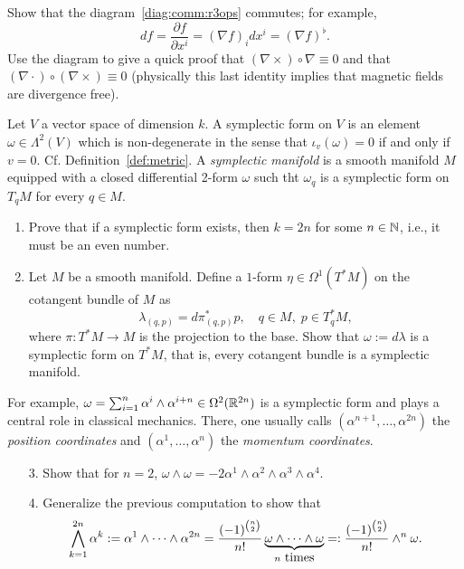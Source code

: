 \begin{exercise}
  Show that the diagram~\eqref{diag:comm:r3ops} commutes; for example,
  \begin{equation}
    df = \frac{\partial f}{\partial x^i} = (\nabla f)_i dx^i = (\nabla f)^\flat.
  \end{equation}
  Use the diagram to give a quick proof that $(\nabla\times)\circ \nabla \equiv 0$ and that $(\nabla\cdot) \circ (\nabla\times) \equiv 0$ (physically this last identity implies that magnetic fields are divergence free).
\end{exercise}

\begin{exercise}\label{exe:symplectic}
  Let $V$ a vector space of dimension $k$.
  A symplectic form on $V$ is an element $\omega\in\Lambda^2(V)$ which is non-degenerate in the sense that $\iota_v(\omega) = 0$ if and only if $v=0$.
  Cf. Definition~\ref{def:metric}.
  A \emph{symplectic manifold} is a smooth manifold $M$ equipped with a closed differential 2-form $\omega$ such tht $\omega_q$ is a symplectic form on $T_q M$ for every $q\in M$.
  \begin{enumerate}
    \item Prove that if a symplectic form exists, then $k=2n$ for some $n\in\mathbb{N}$, i.e., it must be an even number.
    \item Let $M$ be a smooth manifold. Define a $1$-form $\eta\in\Omega^1(T^*M)$ on the cotangent bundle of $M$ as
    \begin{equation}
      \lambda_{(q,p)} = d\pi_{(q,p)}^*p,
      \quad
      q\in M, \;
      p\in T_q^*M,
    \end{equation}
    where $\pi:T^*M\to M$ is the projection to the base.
    Show that $\omega := d\lambda$ is a symplectic form on $T^* M$, that is, every cotangent bundle is a symplectic manifold.
  \end{enumerate}

  For example, $\omega = \sum_{i=1}^n \alpha^i\wedge \alpha^{i+n}\in\Omega^2(\mathbb{R}^{2n})$ is a symplectic form and plays a central role in classical mechanics. There, one usually calls $(\alpha^{n+1},\ldots,\alpha^{2n})$ the \emph{position coordinates} and $(\alpha^{1},\ldots,\alpha^{n})$ the \emph{momentum coordinates}.
  \begin{enumerate}
    \item[3.] Show that for $n=2$, $\omega \wedge \omega = -2 \alpha^1\wedge\alpha^2\wedge\alpha^3\wedge\alpha^4$.

    \item[4.] Generalize the previous computation to show that
    \begin{equation}
      \bigwedge_{k=1}^{2n} \alpha^k := \alpha^1\wedge\cdots\wedge\alpha^{2n} = \frac{(-1)^{\binom{n}{2}}}{n!} \LaTeXunderbrace{\omega\wedge\cdots\wedge\omega}_{n\mbox{ times}} =: \frac{(-1)^{\binom{n}{2}}}{n!} \wedge^{n} \omega.
    \end{equation}
  \end{enumerate}
\end{exercise}

